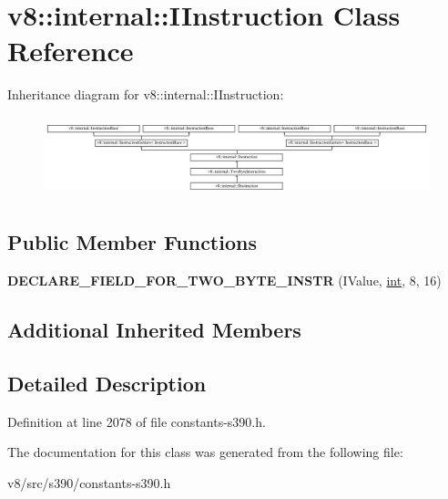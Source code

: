 \hypertarget{classv8_1_1internal_1_1IInstruction}{}\section{v8\+:\+:internal\+:\+:I\+Instruction Class Reference}
\label{classv8_1_1internal_1_1IInstruction}
Inheritance diagram for v8\+:\+:internal\+:\+:I\+Instruction\+:\begin{figure}[H]
\begin{center}
\leavevmode
\includegraphics[height=2.364865cm]{classv8_1_1internal_1_1IInstruction}
\end{center}
\end{figure}
\subsection*{Public Member Functions}
\begin{DoxyCompactItemize}
\item 
\mbox{\label{classv8_1_1internal_1_1IInstruction_a7a819e0720ec71d5d724430ab379de76}} 
{\bfseries D\+E\+C\+L\+A\+R\+E\+\_\+\+F\+I\+E\+L\+D\+\_\+\+F\+O\+R\+\_\+\+T\+W\+O\+\_\+\+B\+Y\+T\+E\+\_\+\+I\+N\+S\+TR} (I\+Value, \mbox{\hyperlink{classint}{int}}, 8, 16)
\end{DoxyCompactItemize}
\subsection*{Additional Inherited Members}


\subsection{Detailed Description}


Definition at line 2078 of file constants-\/s390.\+h.



The documentation for this class was generated from the following file\+:\begin{DoxyCompactItemize}
\item 
v8/src/s390/constants-\/s390.\+h\end{DoxyCompactItemize}
